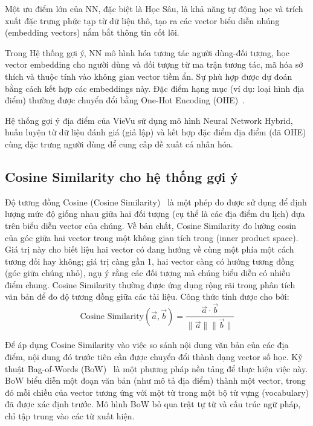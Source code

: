 Một ưu điểm lớn của NN, đặc biệt là Học Sâu, là khả năng tự động học và trích xuất đặc trưng phức tạp từ dữ liệu thô, tạo ra các vector biểu diễn nhúng (embedding vectors) nắm bắt thông tin cốt lõi.

Trong Hệ thống gợi ý, NN mô hình hóa tương tác người dùng-đối tượng, học vector embedding cho người dùng và đối tượng từ ma trận tương tác, mã hóa sở thích và thuộc tính vào không gian vector tiềm ẩn. Sự phù hợp được dự đoán bằng cách kết hợp các embeddings này. Đặc điểm hạng mục (ví dụ: loại hình địa điểm) thường được chuyển đổi bằng One-Hot Encoding (OHE)~\cite{ohe_concept}.

Hệ thống gợi ý địa điểm của VieVu sử dụng mô hình Neural Network Hybrid, huấn luyện từ dữ liệu đánh giá (giả lập) và kết hợp đặc điểm địa điểm (đã OHE) cùng đặc trưng người dùng để cung cấp đề xuất cá nhân hóa.
\subsection{Cosine Similarity cho hệ thống gợi ý}


Độ tương đồng Cosine (Cosine Similarity)~\cite{cosine_similarity_concept} là một phép đo được sử dụng để định lượng mức độ giống nhau giữa hai đối tượng (cụ thể là các địa điểm du lịch) dựa trên biểu diễn vector của chúng. Về bản chất, Cosine Similarity đo lường cosin của góc giữa hai vector trong một không gian tích trong (inner product space). Giá trị này cho biết liệu hai vector có đang hướng về cùng một phía một cách tương đối hay không; giá trị càng gần 1, hai vector càng có hướng tương đồng (góc giữa chúng nhỏ), ngụ ý rằng các đối tượng mà chúng biểu diễn có nhiều điểm chung. Cosine Similarity thường được ứng dụng rộng rãi trong phân tích văn bản để đo độ tương đồng giữa các tài liệu. Công thức tính được cho bởi:
$$\text{Cosine Similarity}(\vec{a}, \vec{b}) = \frac{\vec{a} \cdot \vec{b}}{\|\vec{a}\| \|\vec{b}\|}$$

Để áp dụng Cosine Similarity vào việc so sánh nội dung văn bản của các địa điểm, nội dung đó trước tiên cần được chuyển đổi thành dạng vector số học. Kỹ thuật Bag-of-Words (BoW)~\cite{bow_concept} là một phương pháp nền tảng để thực hiện việc này. BoW biểu diễn một đoạn văn bản (như mô tả địa điểm) thành một vector, trong đó mỗi chiều của vector tương ứng với một từ trong một bộ từ vựng (vocabulary) đã được xác định trước. Mô hình BoW bỏ qua trật tự từ và cấu trúc ngữ pháp, chỉ tập trung vào các từ xuất hiện.

